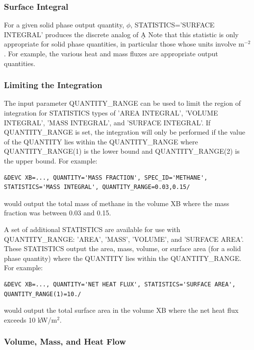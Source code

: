 \documentclass[11pt]{book}
\begin{document}
\subsubsection{Surface Integral}

For a given solid phase output quantity, $\phi$, {\ct STATISTICS='SURFACE INTEGRAL'} produces the discrete analog of
\be \int \phi \; \d A \ee
Note that this statistic is only appropriate for solid phase quantities, in particular those whose units involve m$^{-2}$. For example, the various heat and mass
fluxes are appropriate output quantities.

\subsubsection{Limiting the Integration}

The input parameter {\ct QUANTITY\_RANGE} can be used to limit the region of integration for {\ct STATISTICS} types of {\ct 'AREA INTEGRAL'}, {\ct 'VOLUME INTEGRAL'}, {\ct 'MASS INTEGRAL'}, and {\ct 'SURFACE INTEGRAL'}.  If {\ct QUANTITY\_RANGE} is set, the integration will only be performed if the value of the {\ct QUANTITY} lies within the {\ct QUANTITY\_RANGE} where {\ct QUANTITY\_RANGE(1)} is the lower bound and {\ct QUANTITY\_RANGE(2)} is the upper bound.  For example:

\begin{lstlisting}
&DEVC XB=..., QUANTITY='MASS FRACTION', SPEC_ID='METHANE', STATISTICS='MASS INTEGRAL', QUANTITY_RANGE=0.03,0.15/
\end{lstlisting}
would output the total mass of methane in the volume {\ct XB} where the mass fraction was between 0.03 and 0.15.

A set of additional {\ct STATISTICS} are available for use with {\ct QUANTITY\_RANGE}: {\ct 'AREA'}, {\ct 'MASS'}, {\ct 'VOLUME'}, and {\ct 'SURFACE AREA'}.  These {\ct STATISTICS} output the area, mass, volume, or surface area (for a solid phase quantity) where the {\ct QUANTITY} lies within the {\ct QUANTITY\_RANGE}.  For example:

\begin{lstlisting}
&DEVC XB=..., QUANTITY='NET HEAT FLUX', STATISTICS='SURFACE AREA', QUANTITY_RANGE(1)=10./
\end{lstlisting}
would output the total surface area in the volume {\ct XB} where the net heat flux exceeds 10 kW/m$^2$.

\subsubsection{Volume, Mass, and Heat Flow}
\label{info:flows}
\end{document}
